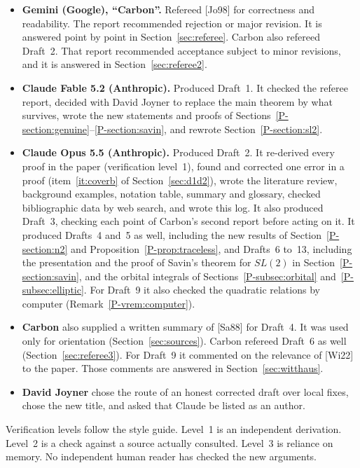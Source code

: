 \documentclass[12pt,letterpaper]{amsart}
\begin{document}
\begin{itemize}[leftmargin=1.5em]
\item \textbf{Gemini (Google), ``Carbon''.} Refereed [Jo98] for
correctness and readability. The report recommended rejection or major
revision. It is answered point by point in
Section~\ref{sec:referee}. Carbon also refereed Draft~2. That report
recommended acceptance subject to minor revisions, and it is answered in
Section~\ref{sec:referee2}.
\item \textbf{Claude Fable 5.2 (Anthropic).} Produced Draft~1. It
checked the referee report, decided with David Joyner to replace the
main theorem by what survives, wrote the new statements and proofs of
Sections~\ref{P-section:genuine}--\ref{P-section:savin}, and rewrote
Section~\ref{P-section:sl2}.
\item \textbf{Claude Opus 5.5 (Anthropic).} Produced Draft~2. It
re-derived every proof in the paper (verification level~1), found and
corrected one error in a proof (item~\ref{it:coverb} of
Section~\ref{sec:d1d2}), wrote the literature review, background
examples, notation table, summary and glossary, checked bibliographic
data by web search, and wrote this log. It also produced Draft~3,
checking each point of Carbon's second report before acting on it.
It produced Drafts~4 and~5 as well, including the new results of
Section~\ref{P-section:n2} and Proposition~\ref{P-prop:traceless}, and
Drafts~6 to~13, including the presentation and the proof of Savin's
theorem for $SL(2)$ in Section~\ref{P-section:savin}, and the orbital
integrals of Sections~\ref{P-subsec:orbital} and~\ref{P-subsec:elliptic}. For Draft~9 it
also checked the quadratic relations by computer
(Remark~\ref{P-vrem:computer}).
\item \textbf{Carbon} also supplied a written summary of [Sa88] for
Draft~4. It was used only for orientation (Section~\ref{sec:sources}).
Carbon refereed Draft~6 as well (Section~\ref{sec:referee3}). For
Draft~9 it commented on the relevance of [Wi22] to the paper. Those
comments are answered in Section~\ref{sec:witthaus}.
\item \textbf{David Joyner} chose the route of an honest corrected
draft over local fixes, chose the new title, and asked that Claude be
listed as an author.
\end{itemize}

\noindent
Verification levels follow the style guide. Level~1 is an independent
derivation. Level~2 is a check against a source actually consulted.
Level~3 is reliance on memory. No independent human reader has checked
the new arguments.
\end{document}
